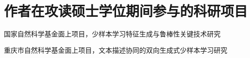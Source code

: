 \section[\hspace{-2pt}作者在攻读硕士学位期间参与的科研项目]{{\heiti{} \hspace{-8pt}作者在攻读硕士学位期间参与的科研项目}}

{
\small
\setlength{\baselineskip}{20pt}
\begin{enumerate}[label={[\arabic*]}, leftmargin=*]
\item 国家自然科学基金面上项目，少样本学习特征生成与鲁棒性关键技术研究
\item 重庆市自然科学基金面上项目，文本描述协同的双向生成式少样本学习研究
\end{enumerate}
}


